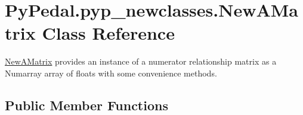 \hypertarget{classPyPedal_1_1pyp__newclasses_1_1NewAMatrix}{
\section{PyPedal.pyp\_\-newclasses.NewAMatrix Class Reference}
\label{classPyPedal_1_1pyp__newclasses_1_1NewAMatrix}
}


\hyperlink{classPyPedal_1_1pyp__newclasses_1_1NewAMatrix}{NewAMatrix} provides an instance of a numerator relationship matrix as a Numarray array of floats with some convenience methods.  


\subsection*{Public Member Functions}
